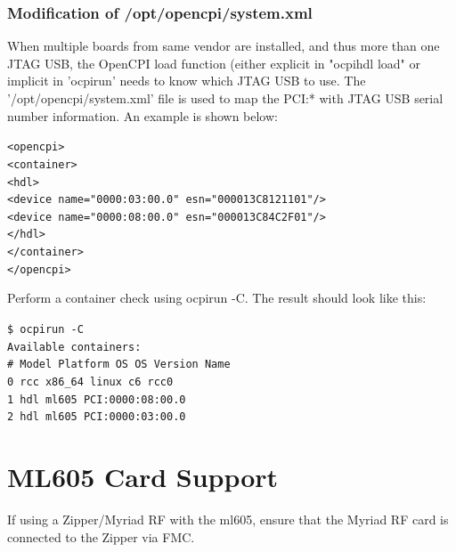 \documentclass{article}
\newcommand{\terminaloutput}[1]{\texttt{#1}}
\begin{document}
\subsubsection*{Modification of /opt/opencpi/system.xml}
When multiple boards from same vendor are installed, and thus more than one JTAG USB, the OpenCPI load function (either explicit in "ocpihdl load" or implicit in 'ocpirun' needs to know which JTAG USB to use. The '/opt/opencpi/system.xml' file is used to map the PCI:* with JTAG USB serial number information. An example is shown below:\par\bigskip
\noindent\terminaloutput{<opencpi>\\
<container>\\
<hdl>\\
<device name="0000:03:00.0" esn="000013C8121101"/>\\
<device name="0000:08:00.0" esn="000013C84C2F01"/>\\
</hdl>\\
</container>\\
</opencpi>}\par\bigskip
\noindent Perform a container check using ocpirun -C. The result should look like this:\par\bigskip
\noindent\terminaloutput{\$ ocpirun -C\\
Available containers:\\
 \#  Model\hspace{6ex} Platform\hspace{3ex}    OS\hspace{5ex}     OS Version\hspace{1ex}  Name\\
 0  rcc\hspace{9ex}   x86\_64\hspace{5ex}      linux\hspace{2ex}  c6\hspace{10ex}          rcc0\\
  1  hdl\hspace{9ex}   ml605\hspace{29ex}                          PCI:0000:08:00.0\\
  2  hdl\hspace{9ex}   ml605\hspace{29ex}                          PCI:0000:03:00.0}\\

\section*{ML605 Card Support}
If using a Zipper/Myriad RF with the ml605, ensure that the Myriad RF card is connected to the Zipper via FMC.
\end{document}
